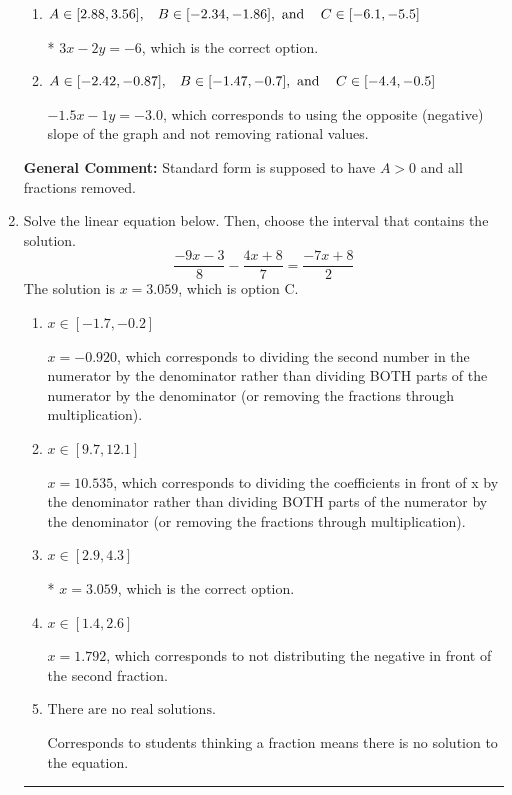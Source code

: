 \documentclass{extbook}[14pt]
\newcommand{\litem}[1]{\item #1

\rule{\textwidth}{0.4pt}}
\begin{document}
\begin{enumerate}
{\begin{enumerate}[label=\Alph*.]
 $3x + 2y = 6$, which corresponds to using the opposite (negative) slope of the graph, but did everything else correctly.
\item \( A \in [2.88, 3.56], \hspace{3mm} B \in [-2.34, -1.86], \text{ and } \hspace{3mm} C \in [-6.1, -5.5] \)

* $3x - 2y = -6$, which is the correct option.
\item \( A \in [-2.42, -0.87], \hspace{3mm} B \in [-1.47, -0.7], \text{ and } \hspace{3mm} C \in [-4.4, -0.5] \)

 $-1.5x - 1y = -3.0$, which corresponds to using the opposite (negative) slope of the graph and not removing rational values.
\end{enumerate}

\textbf{General Comment:} Standard form is supposed to have $A > 0$ and all fractions removed.
}
\litem{
Solve the linear equation below. Then, choose the interval that contains the solution.
\[ \frac{-9x -3}{8} - \frac{4x + 8}{7} = \frac{-7x + 8}{2} \]The solution is \( x = 3.059 \), which is option C.\begin{enumerate}[label=\Alph*.]
\item \( x \in [-1.7, -0.2] \)

 $x = -0.920$, which corresponds to dividing the second number in the numerator by the denominator rather than dividing BOTH parts of the numerator by the denominator (or removing the fractions through multiplication).
\item \( x \in [9.7, 12.1] \)

 $x = 10.535$, which corresponds to dividing the coefficients in front of x by the denominator rather than dividing BOTH parts of the numerator by the denominator (or removing the fractions through multiplication).
\item \( x \in [2.9, 4.3] \)

* $x = 3.059$, which is the correct option.
\item \( x \in [1.4, 2.6] \)

 $x = 1.792$, which corresponds to not distributing the negative in front of the second fraction.
\item \( \text{There are no real solutions.} \)

Corresponds to students thinking a fraction means there is no solution to the equation.
\end{enumerate}

}
\end{enumerate}
\end{document}
